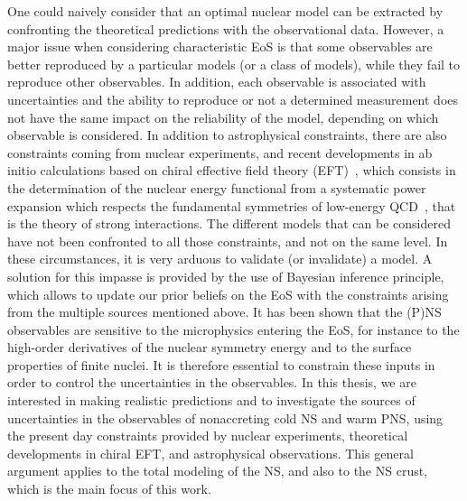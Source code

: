 One could naively consider that an optimal nuclear model can be extracted by 
confronting the theoretical predictions with the observational data. However, 
a major issue when considering characteristic EoS is that some
observables are better reproduced by a particular models (or a class of 
models), while they fail to reproduce other observables. In addition, each
observable is associated with uncertainties and the ability to reproduce or not 
a determined measurement does not have the same impact on the reliability of
the model, depending on which observable is considered.
In addition to astrophysical constraints, there are also constraints coming
from nuclear experiments, and recent developments in ab initio calculations 
based on chiral effective field theory (EFT)~\cite{Drischler2016}, which
consists in the determination of the nuclear energy functional from a
systematic power expansion which respects the fundamental symmetries of
low-energy QCD~\cite{Machleidt2011}, that is the theory of strong interactions. 
The different models that can be considered have not been confronted to all 
those constraints, and not on the same level. In these circumstances, it is 
very arduous to validate (or invalidate) a model. A solution for this impasse 
is provided by the use of Bayesian inference principle, which allows to update 
our prior beliefs on the EoS with the constraints arising from the multiple 
sources mentioned above.
%
It has been shown that the (P)NS observables are sensitive to the 
microphysics entering the EoS, for instance to the high-order derivatives of 
the nuclear symmetry energy and to the surface properties of finite nuclei. 
It is therefore essential to constrain these inputs in order to control the 
uncertainties in the observables.
In this thesis, we are interested in making realistic predictions and to
investigate the sources of uncertainties in the observables of nonaccreting
cold NS and warm PNS, using the present day constraints provided by nuclear
experiments, theoretical developments in chiral EFT, and astrophysical 
observations. This general argument applies to the total modeling of the 
NS, and also to the NS crust, which is the main focus of this work. 

